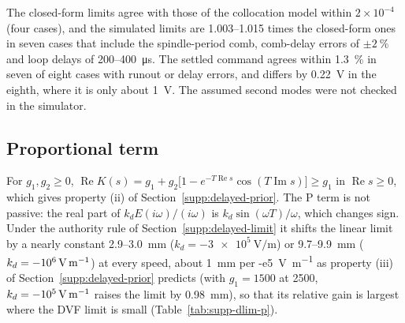 The closed-form limits agree with those of the collocation model within $2\times10^{-4}$ (four cases), and the simulated limits are 1.003--1.015 times the closed-form ones in seven cases that include the spindle-period comb, comb-delay errors of $\pm\SI{2}{\percent}$ and loop delays of 200--\SI{400}{\micro\second}. The settled command agrees within \SI{1.3}{\percent} in seven of eight cases with runout or delay errors, and differs by \SI{0.22}{\volt} in the eighth, where it is only about \SI{1}{\volt}. The assumed second modes were not checked in the simulator.

\subsection{Proportional term}\label{supp:delayed-p}

For $g_1,g_2\ge0$, $\operatorname{Re}K(s)=g_1+g_2\bigl[1-e^{-T\operatorname{Re}s}\cos(T\operatorname{Im}s)\bigr]\ge g_1$ in $\operatorname{Re}s\ge0$, which gives property (ii) of Section~\ref{supp:delayed-prior}. The P term is not passive: the real part of $k_dE(i\omega)/(i\omega)$ is $k_d\sin(\omega T)/\omega$, which changes sign. Under the authority rule of Section~\ref{supp:delayed-limit} it shifts the linear limit by a nearly constant 2.9--\SI{3.0}{\milli\metre} ($k_d=\SI{-3e5}{\volt\per\metre}$) or 9.7--\SI{9.9}{\milli\metre} ($k_d=\SI{-e6}{\volt\per\metre}$) at every speed, about \SI{1}{\milli\metre} per \SI{-e5}{\volt\per\metre} as property (iii) of Section~\ref{supp:delayed-prior} predicts (with $g_1=1500$ at \SI{2500}{\rpm}, $k_d=\SI{-e5}{\volt\per\metre}$ raises the limit by \SI{0.98}{\milli\metre}), so that its relative gain is largest where the DVF limit is small (Table~\ref{tab:supp-dlim-p}).

